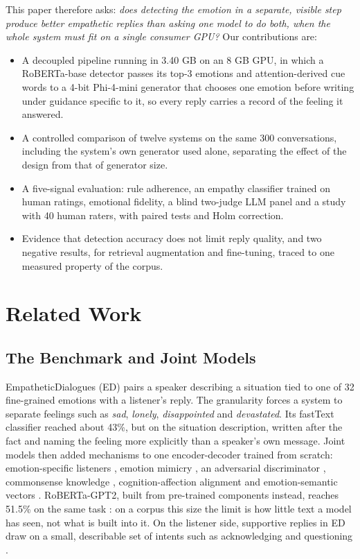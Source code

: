 \documentclass[conference]{IEEEtran}
\begin{document}
This paper therefore asks: \textit{does detecting the emotion in a separate, visible step produce better empathetic replies than asking one model to do both, when the whole system must fit on a single consumer GPU?} Our contributions are:
\begin{itemize}
\item A decoupled pipeline running in 3.40 GB on an 8 GB GPU, in which a RoBERTa-base detector passes its top-3 emotions and attention-derived cue words to a 4-bit Phi-4-mini generator that chooses one emotion before writing under guidance specific to it, so every reply carries a record of the feeling it answered.
\item A controlled comparison of twelve systems on the same 300 conversations, including the system's own generator used alone, separating the effect of the design from that of generator size.
\item A five-signal evaluation: rule adherence, an empathy classifier trained on human ratings, emotional fidelity, a blind two-judge LLM panel and a study with 40 human raters, with paired tests and Holm correction.
\item Evidence that detection accuracy does not limit reply quality, and two negative results, for retrieval augmentation and fine-tuning, traced to one measured property of the corpus.
\end{itemize}

\section{Related Work}\label{sec:related}

\subsection{The Benchmark and Joint Models}
EmpatheticDialogues (ED) \cite{b20,b21} pairs a speaker describing a situation tied to one of 32 fine-grained emotions with a listener's reply. The granularity forces a system to separate feelings such as \textit{sad}, \textit{lonely}, \textit{disappointed} and \textit{devastated}. Its fastText classifier reached about 43\%, but on the situation description, written after the fact and naming the feeling more explicitly than a speaker's own message. Joint models then added mechanisms to one encoder-decoder trained from scratch: emotion-specific listeners \cite{b4}, emotion mimicry \cite{b5}, an adversarial discriminator \cite{b6}, commonsense knowledge \cite{b7,b8}, cognition-affection alignment \cite{b9} and emotion-semantic vectors \cite{b10}. RoBERTa-GPT2, built from pre-trained components instead, reaches 51.5\% on the same task \cite{b22}: on a corpus this size the limit is how little text a model has seen, not what is built into it. On the listener side, supportive replies in ED draw on a small, describable set of intents such as acknowledging and questioning \cite{b23}.
\end{document}
